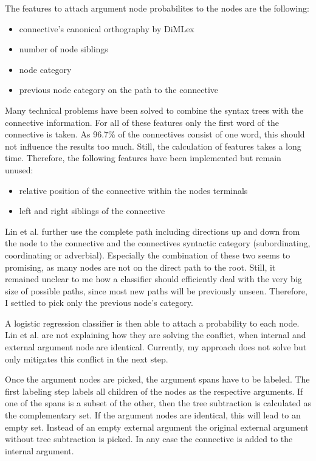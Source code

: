 \documentclass[10pt,a4paper]{article}
\begin{document}
The features to attach argument node probabilites to the nodes are the following:
\begin{itemize}
\item connective's canonical orthography by DiMLex
\item number of node siblings
\item node category
\item previous node category on the path to the connective
\end{itemize}
Many technical problems have been solved to combine the syntax trees with the connective information. For all of these features only the first word of the connective is taken. As 96.7\% of the connectives consist of one word, this should not influence the results too much. Still, the calculation of features takes a long time. Therefore, the following features have been implemented but remain unused:
\begin{itemize}
\item relative position of the connective within the nodes terminals
\item left and right siblings of the connective
\end{itemize}
Lin et al. further use the complete path including directions up and down from the node to the connective and the connectives syntactic category (subordinating, coordinating or adverbial). Especially the combination of these two seems to promising, as many nodes are not on the direct path to the root. Still, it remained unclear to me how a classifier should efficiently deal with the very big size of possible paths, since most new paths will be previously unseen. Therefore, I settled to pick only the previous node's category.

A logistic regression classifier is then able to attach a probability to each node. Lin et al. are not explaining how they are solving the conflict, when internal and external argument node are identical. Currently, my approach does not solve but only mitigates this conflict in the next step.

Once the argument nodes are picked, the argument spans have to be labeled. The first labeling step labels all children of the nodes as the respective arguments. If one of the spans is a subset of the other, then the tree subtraction is calculated as the complementary set. If the argument nodes are identical, this will lead to an empty set. Instead of an empty external argument the original external argument without tree subtraction is picked. In any case the connective is added to the internal argument. 
\end{document}
